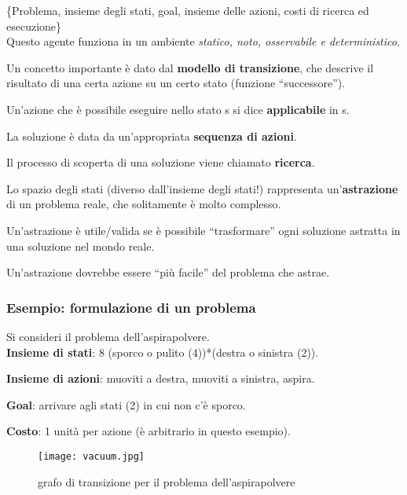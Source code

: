 \{Problema, insieme degli stati, goal, insieme delle azioni, costi
di ricerca ed esecuzione\}\\

Questo agente funziona in un ambiente \textit{statico, noto, osservabile e
deterministico}.

Un concetto importante è dato dal \textbf{modello di transizione}, che
descrive il risultato di una certa azione su un certo stato
(funzione ``successore'').

Un'azione che è possibile eseguire nello stato s si dice \textbf{applicabile}
in s.

La soluzione è data da un'appropriata \textbf{sequenza di azioni}.

Il processo di scoperta di una soluzione viene chiamato \textbf{ricerca}.

Lo spazio degli stati (diverso dall'insieme degli stati!) rappresenta
un'\textbf{astrazione} di un problema reale, che solitamente è molto complesso.

Un'astrazione è utile/valida se è possibile ``trasformare'' ogni soluzione
astratta in una soluzione nel mondo reale.

Un'astrazione dovrebbe essere ``più facile'' del problema che astrae.

\subsubsection{Esempio: formulazione di un problema}

Si consideri il problema dell'aspirapolvere. \\

\textbf{Insieme di stati}: 8 (sporco o pulito (4))*(destra o sinistra (2)).

\textbf{Insieme di azioni}: muoviti a destra, muoviti a sinistra, aspira.

\textbf{Goal}: arrivare agli stati (2) in cui non c'è sporco.

\textbf{Costo}: 1 unità per azione (è arbitrario in questo esempio).

\begin{figure}[H]
\centering
\texttt{[image: vacuum.jpg]}
\caption{grafo di transizione per il problema dell'aspirapolvere}
\label{fig:vacuum}
\end{figure}
